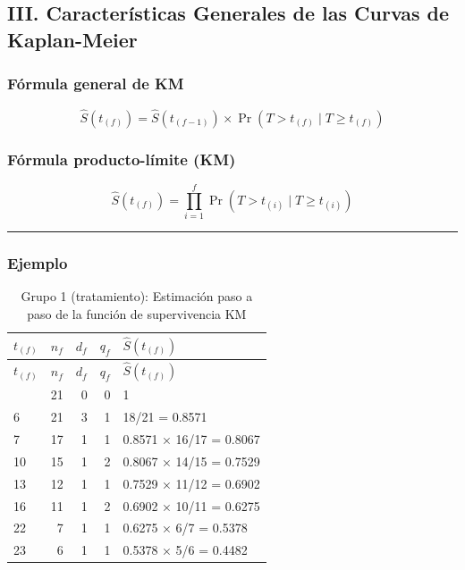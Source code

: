 \documentclass[
]{article}
\begin{document}
\subsection{III. Características Generales de las Curvas de
Kaplan-Meier}\label{iii.-caracteruxedsticas-generales-de-las-curvas-de-kaplan-meier}

\subsubsection{Fórmula general de KM}\label{fuxf3rmula-general-de-km}

\[
\hat{S}(t_{(f)}) = \hat{S}(t_{(f-1)}) \times \Pr(T > t_{(f)} \mid T \ge t_{(f)})
\]

\subsubsection{Fórmula producto-límite
(KM)}\label{fuxf3rmula-producto-luxedmite-km}

\[
\hat{S}(t_{(f)}) = \prod_{i=1}^{f} \Pr(T > t_{(i)} \mid T \ge t_{(i)})
\]

\begin{center}\rule{0.5\linewidth}{0.5pt}\end{center}

\subsubsection{Ejemplo}\label{ejemplo}

\begin{longtable}[]{@{}lrrrl@{}}
\caption{Grupo 1 (tratamiento): Estimación paso a paso de la función de
supervivencia KM}\tabularnewline
\toprule\noalign{}
\(t_{(f)}\) & \(n_f\) & \(d_f\) & \(q_f\) & \(\hat{S}(t_{(f)})\) \\
\midrule\noalign{}
\endfirsthead
\toprule\noalign{}
\(t_{(f)}\) & \(n_f\) & \(d_f\) & \(q_f\) & \(\hat{S}(t_{(f)})\) \\
\midrule\noalign{}
\endhead
\bottomrule\noalign{}
\endlastfoot
0 & 21 & 0 & 0 & 1 \\
6 & 21 & 3 & 1 & 18/21 = 0.8571 \\
7 & 17 & 1 & 1 & 0.8571 × 16/17 = 0.8067 \\
10 & 15 & 1 & 2 & 0.8067 × 14/15 = 0.7529 \\
13 & 12 & 1 & 1 & 0.7529 × 11/12 = 0.6902 \\
16 & 11 & 1 & 2 & 0.6902 × 10/11 = 0.6275 \\
22 & 7 & 1 & 1 & 0.6275 × 6/7 = 0.5378 \\
23 & 6 & 1 & 1 & 0.5378 × 5/6 = 0.4482 \\
\end{longtable}
\end{document}
